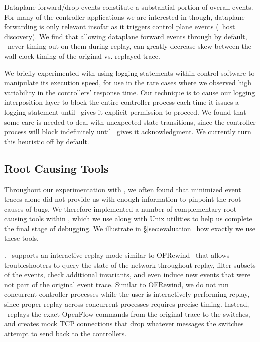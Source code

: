 
 Dataplane forward/drop events constitute a
substantial portion of overall events. For
many of the controller applications we are interested in though, dataplane
forwarding is only relevant insofar as it triggers control plane events
(\eg~host discovery). We find that allowing dataplane forward events through by
default, \ie~never timing out on them during replay, can greatly decrease
skew between the wall-clock timing of the original vs. replayed trace.

 We briefly experimented
with using logging statements within control software to manipulate its execution speed,
for use in the rare cases where we observed high variability in the
controllers' response time. Our technique is to cause our logging
interposition layer to block the entire controller
process each time it issues a logging statement until \projectname~gives it
explicit permission to proceed. We found that some care is needed to deal
with unexpected state transitions, since the controller process will block
indefinitely until \projectname~gives it acknowledgment.
We currently turn this heuristic off by default.

\subsection{Root Causing Tools}
\label{subsec:root_causing}

Throughout our experimentation with \projectname, we often found that
minimized event traces alone did not provide us with enough information to
pinpoint the root causes of bugs. We therefore implemented a number of
complementary root
causing tools within \projectname,
which we use along with Unix utilities to help us complete the final
stage of debugging. We illustrate in \S\ref{sec:evaluation}~how exactly we use
these tools.

. \projectname~supports an interactive replay mode
similar to OFRewind~\cite{ofrewind} that allows troubleshooters to query the
state of the network throughout replay, filter subsets of the events, check
additional invariants, and
even induce new events that were not part of the original event trace.
Similar to OFRewind, we do not run concurrent controller processes while the
user is interactively performing replay, since proper replay across
concurrent processes requires precise timing.
Instead, \projectname~replays the exact OpenFlow commands from the
original trace to the switches, and creates mock TCP connections that drop
whatever messages the switches attempt to send back to the controllers.

